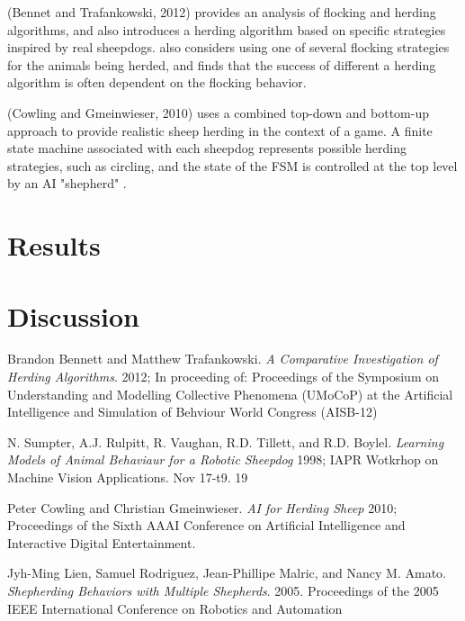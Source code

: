 \documentclass[12pt,twocolumn]{article}
\begin{document}
(Bennet and Trafankowski, 2012) provides an analysis of flocking and herding algorithms, and also introduces a
herding algorithm based on specific strategies inspired by real sheepdogs\cite{bennet}.
\cite{bennet} also considers using one of several flocking strategies for the animals being herded, and finds
that the success of different a herding algorithm is often dependent on the flocking behavior.

(Cowling and Gmeinwieser, 2010) uses a combined top-down and bottom-up approach to provide realistic sheep herding
in the context of a game. A finite state machine associated with each sheepdog represents possible herding strategies,
such as circling, and the state of the FSM is controlled at the top level by an AI "shepherd" \cite{cowling}.





\section{Results}


\section{Discussion}



\begin{thebibliography}{9}


Brandon Bennett and Matthew Trafankowski.
\emph{A Comparative Investigation of Herding Algorithms}.
2012; In proceeding of: Proceedings of the Symposium on Understanding and Modelling Collective Phenomena (UMoCoP) at the Artificial Intelligence and Simulation of Behviour World Congress (AISB-12)

N. Sumpter, A.J. Rulpitt, R. Vaughan, R.D. Tillett, and R.D. Boylel.
\emph{Learning Models of Animal Behaviaur for a Robotic Sheepdog}
1998; IAPR Wotkrhop on Machine Vision Applications. Nov 17-t9. 19%

Peter Cowling and Christian Gmeinwieser.
\emph{AI for Herding Sheep}
2010; Proceedings of the Sixth AAAI Conference on Artificial Intelligence and Interactive Digital Entertainment.


Jyh-Ming Lien, Samuel Rodriguez, Jean-Phillipe Malric, and Nancy M. Amato.
\emph{Shepherding Behaviors with Multiple Shepherds}.
2005. Proceedings of the 2005 IEEE International Conference on Robotics and Automation

\end{thebibliography}
\end{document}
